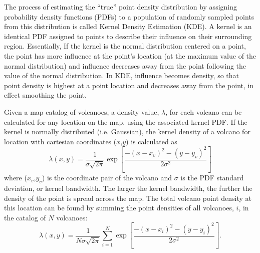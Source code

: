 \documentclass[12pt,letter]{article}
\begin{document}
The process of estimating the ``true'' point density distribution by assigning probability density functions (PDFs) to a population of randomly sampled points from this distribution is called Kernel Density Estimation (KDE). A kernel is an identical PDF assigned to points to describe their influence on their surrounding region. Essentially, If the kernel is the normal distribution centered on a point, the point has more influence at the point's location (at the maximum value of the normal distribution) and influence decreases away from the point following the value of the normal distribution. In KDE, influence becomes density, so that point density is highest at a point location and decreases away from the point, in effect smoothing the point.

Given a map catalog of volcanoes, a density value, $\lambda$, for each volcano can be calculated for any location on the map, using the associated kernel PDF. If the kernel is normally distributed (i.e. Gaussian), the kernel density of a volcano for location with cartesian coordinates ($x$,$y$) is calculated as
\begin{equation}
\lambda(x,y) = \frac{1}{\sigma\sqrt{2\pi}}\exp\left[\frac{-(x-x_v)^2-(y-y_v)^2}{2\sigma^2}\right]
\end{equation}
where ($x_v$,$y_v$) is the coordinate pair of the volcano and $\sigma$ is the PDF standard deviation, or kernel bandwidth. The larger the kernel bandwidth, the further the density of the point is spread across the map. The total volcano point density at this location can be found by summing the point densities of all volcanoes, $i$, in the catalog of $N$ volcanoes:
\begin{equation}
\lambda(x,y) = \frac{1}{N\sigma\sqrt{2\pi}}\sum\limits_{i=1}^{N}\exp\left[\frac{-(x-x_i)^2-(y-y_i)^2}{2\sigma^2}\right].
\label{eq_simpleKDE}
\end{equation}
\end{document}
